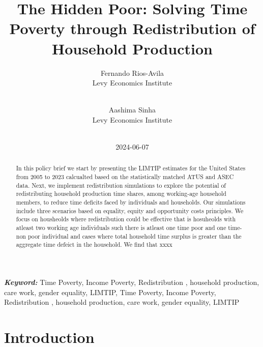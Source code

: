 \documentclass[
  11pt,
]{article}
\title{The Hidden Poor: Solving Time Poverty through Redistribution of
Household Production}
\author{
Fernando Rios-Avila\\
Levy Economics Institute\\
\\
\and 
Aashima Sinha\\
Levy Economics Institute\\
\\
}
\date{2024-06-07}
\begin{document}
\def\spacingset#1{\renewcommand{\baselinestretch}%
{#1}\small\normalsize} \spacingset{1}


\maketitle
\begin{abstract}
In this policy brief we start by presenting the LIMTIP estimates for the
United States from 2005 to 2023 calcualted based on the statistically
matched ATUS and ASEC data. Next, we implement redistribution
simulations to explore the potential of redistributing household
production time shares, among working-age household members, to reduce
time deficits faced by individuals and households. Our simulations
include three scenarios based on equality, equity and opportunity costs
principles. We focus on housheolds where redistribution could be
effective that is hosuheolds with atleast two working age individuals
such there is atleast one time poor and one time-non poor individual and
cases where total household time surplus is greater than the aggregate
time defeict in the household. We find that xxxx
\end{abstract}
 
\vspace{.2in}

\textbf{\textit{Keyword: }}
    Time Poverty, Income Poverty, Redistribution , household production,
care work, gender equality, LIMTIP, 
    Time Poverty, Income Poverty, Redistribution , household production,
care work, gender equality, LIMTIP 


\thispagestyle{empty}
\clearpage{}
\newpage
\spacingset{1.2} %
\section{Introduction}\label{introduction}
\end{document}
